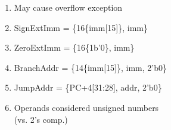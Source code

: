 \begin{enumerate}[label=\alph*.,leftmargin=1em]
	\item {May cause overflow exception}
	\item {SignExtImm = \{16\{imm[15]\}, imm\}}
	\item {ZeroExtImm = \{16\{1b'0\}, imm\}}
	\item {BranchAddr = \{14\{imm[15]\}, imm, 2'b0\}}
	\item {JumpAddr = \{PC+4[31:28], addr, 2'b0\}}
	\item {Operands considered unsigned numbers \\ (vs. 2's comp.)}
\end{enumerate}
